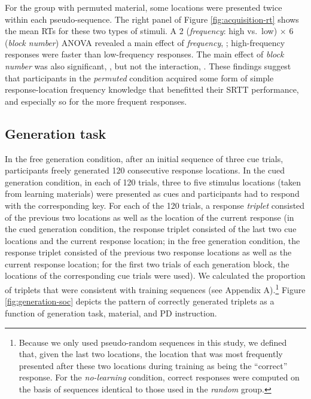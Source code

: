 \documentclass[
  english,
  man]{apa6}
\begin{document}
For the group with permuted material, some locations were presented twice within each pseudo-sequence.
The right panel of Figure \ref{fig:acquisition-rt} shows the mean RTs for these two types of stimuli. A 2 (\emph{frequency}: high vs.~low) \(\times\) 6 (\emph{block number}) ANOVA revealed a main effect of \emph{frequency}, ; high-frequency responses were faster than low-frequency responses.
The main effect of \emph{block number} was also significant, , but not the interaction, .
These findings suggest that participants in the \emph{permuted} condition acquired some form of simple response-location frequency knowledge that benefitted their SRTT performance, and especially so for the more frequent responses.

\hypertarget{generation-task}{%
\subsection{Generation task}\label{generation-task}}

In the free generation condition, after an initial sequence of three cue trials, participants freely generated 120 consecutive response locations.
In the cued generation condition, in each of 120 trials, three to five stimulus locations (taken from learning materials) were presented as cues and participants had to respond with the corresponding key.
For each of the 120 trials, a response \emph{triplet} consisted of the previous two locations as well as the location of the current response
(in the cued generation condition, the response triplet consisted of the last two cue locations and the current response location;
in the free generation condition, the response triplet consisted of the previous two response locations as well as the current response location;
for the first two trials of each generation block, the locations of the corresponding cue trials were used).
We calculated the proportion of triplets that were consistent with training sequences (see Appendix A).\footnote{Because we only used pseudo-random sequences in this study, we defined that, given the last two locations,
  the location that was most frequently presented after these two locations during training as being the ``correct'' response.
  For the \emph{no-learning} condition, correct responses were computed on the basis of sequences identical to those used in the \emph{random} group.}
Figure \ref{fig:generation-soc} depicts the pattern of correctly generated triplets as a function of generation task, material, and PD instruction.
\end{document}
